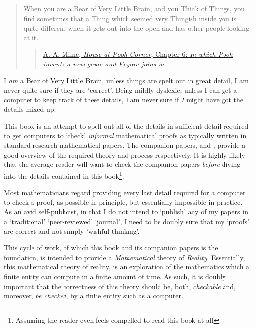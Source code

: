\documentclass[a4paper,openany]{amsbook}
\begin{document}
\vspace{0.5cm}

\begin{quotation}
When you are a Bear of Very Little Brain, and you Think of Things, you find
sometimes that a Thing which seemed very Thingish inside you is quite different
when it gets out into the open and has other people looking at it.

\begin{quote}
\href{https://en.wikiquote.org/wiki/A._A._Milne#The_House_at_Pooh_Corner_.281928.29}{A. A. Milne,
\textit{House at Pooh Corner}, Chapter 6: \textit{In which Pooh invents a new
game and Eeyore joins in}}
\end{quote}
\end{quotation}

\vspace{0.5cm}

I \emph{am} a Bear of Very Little Brain, unless things are spelt out in great
detail, I am never quite sure if they are `correct'.  Being mildly dyslexic,
unless I can get a computer to keep track of these details, I am never sure if
\emph{I} might have got the details mixed-up.

This book is an attempt to spell out all of the details in sufficient detail
required to get computers to `check' \emph{informal} mathematical proofs as
typically written in standard research mathematical papers. The companion
papers, \cite{diSimplexTheory} and \cite{usingDiSimplexTheory}, provide a good
overview of the required theory and process respectively. It is highly likely
that the average reader will want to check the companion papers \emph{before}
diving into the details contained in this book\footnote{ Assuming the reader even
feels compelled to read this book at all}.

Most mathematicians regard providing every last detail required for a computer
to check a proof, as possible in principle, but essentially impossible in
practice. As an avid self-publicist, in that I do not intend to `publish' any of
my papers in a `traditional' `peer-reviewed' `journal', I need to be doubly sure
that my `proofs' are correct and not simply `wishful thinking'.

This cycle of work, of which this book and its companion papers is the
foundation, is intended to provide a \emph{Mathematical} theory of
\emph{Reality}. Essentially, this mathematical theory of reality, is an
exploration of the mathematics which a finite entity can compute in a finite
amount of time. As such, it is doubly important that the correctness of this
theory should be, both, \emph{checkable} and, moreover, \emph{be checked}, by a
finite entity such as a computer.
\end{document}
